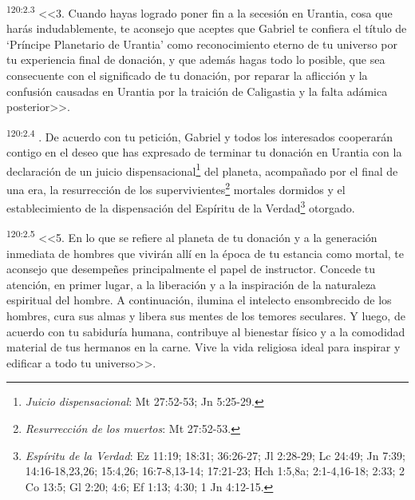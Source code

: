 \par 
\textsuperscript{120:2.3} <<3. Cuando hayas logrado poner fin a la secesión en Urantia, cosa que harás indudablemente, te aconsejo que aceptes que Gabriel te confiera el título de `Príncipe Planetario de Urantia' como reconocimiento eterno de tu universo por tu experiencia final de donación, y que además hagas todo lo posible, que sea consecuente con el significado de tu donación, por reparar la aflicción y la confusión causadas en Urantia por la traición de Caligastia y la falta adámica posterior>>.

\par 
\textsuperscript{120:2.4} . De acuerdo con tu petición, Gabriel y todos los interesados cooperarán contigo en el deseo que has expresado de terminar tu donación en Urantia con la declaración de un juicio dispensacional\footnote{\textit{Juicio dispensacional}: Mt 27:52-53; Jn 5:25-29.} del planeta, acompañado por el final de una era, la resurrección de los supervivientes\footnote{\textit{Resurrección de los muertos}: Mt 27:52-53.} mortales dormidos y el establecimiento de la dispensación del Espíritu de la Verdad\footnote{\textit{Espíritu de la Verdad}: Ez 11:19; 18:31; 36:26-27; Jl 2:28-29; Lc 24:49; Jn 7:39; 14:16-18,23,26; 15:4,26; 16:7-8,13-14; 17:21-23; Hch 1:5,8a; 2:1-4,16-18; 2:33; 2 Co 13:5; Gl 2:20; 4:6; Ef 1:13; 4:30; 1 Jn 4:12-15.} otorgado\guillemotright.

\par 
\textsuperscript{120:2.5} <<5. En lo que se refiere al planeta de tu donación y a la generación inmediata de hombres que vivirán allí en la época de tu estancia como mortal, te aconsejo que desempeñes principalmente el papel de instructor. Concede tu atención, en primer lugar, a la liberación y a la inspiración de la naturaleza espiritual del hombre. A continuación, ilumina el intelecto ensombrecido de los hombres, cura sus almas y libera sus mentes de los temores seculares. Y luego, de acuerdo con tu sabiduría humana, contribuye al bienestar físico y a la comodidad material de tus hermanos en la carne. Vive la vida religiosa ideal para inspirar y edificar a todo tu universo>>.

